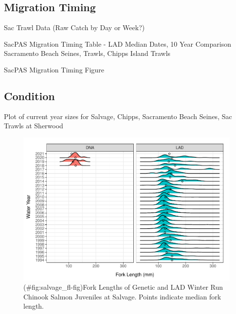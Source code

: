 \documentclass[
]{book}
\theoremstyle{definition}
\theoremstyle{definition}
\theoremstyle{definition}
\theoremstyle{definition}
\theoremstyle{remark}
\begin{document}
\hypertarget{migration-timing-1}{%
\subsection{Migration Timing}\label{migration-timing-1}}

Sac Trawl Data (Raw Catch by Day or Week?)

SacPAS Migration Timing Table - LAD Median Dates, 10 Year Comparison Sacramento Beach Seines, Trawls, Chipps Island Trawls

SacPAS Migration Timing Figure

\hypertarget{condition-2}{%
\subsection{Condition}\label{condition-2}}

Plot of current year sizes for Salvage, Chipps, Sacramento Beach Seines, Sac Trawls at Sherwood

\begin{figure}
\centering
\includegraphics{_main_files/figure-latex/salvage_fl-fig-1.pdf}
\caption{(\#fig:salvage\_fl-fig)Fork Lengths of Genetic and LAD Winter Run Chinook Salmon Juveniles at Salvage. Points indicate median fork length.}
\end{figure}
\end{document}
